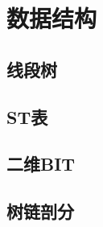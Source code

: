 %
%
	\newpage
	\section{数据结构}
	\subsection{线段树}
	
	\subsection{ST表}
	
	\newpage
	\subsection{二维BIT}
	
	\newpage
	\subsection{树链剖分}
	
%	
%